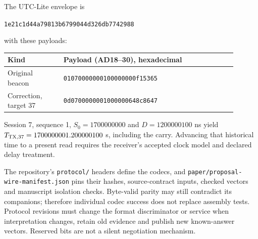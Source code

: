 \documentclass[11pt,letterpaper]{article}
\begin{document}
The UTC-Lite envelope is
\begin{center}\small\texttt{1e21c1d44a79813b6799044d326db7742988}\end{center}
with these payloads:
\begin{center}\small
\begin{tabular}{@{}L{0.22\linewidth}L{0.68\linewidth}@{}}\toprule
Kind & Payload (AD18--30), hexadecimal \\\midrule
Original beacon & \texttt{01070000000100000000f15365} \\
Correction, target 37 & \texttt{0d0700000001000000648c8647} \\\bottomrule
\end{tabular}
\end{center}
Session 7, sequence 1, $S_0=1700000000$ and $D=1200000100$ ns yield $T_{{\rm TX},37}=1700000001.200000100$ s, including the carry. Advancing that historical time to a present read requires the receiver's accepted clock model and declared delay treatment.

The repository's \texttt{protocol/} headers define the codecs, and \texttt{paper/proposal-wire-manifest.json} pins their hashes, source-contract inputs, checked vectors and manuscript isolation checks. Byte-valid parity may still contradict its companions; therefore individual codec success does not replace assembly tests. Protocol revisions must change the format discriminator or service when interpretation changes, retain old evidence and publish new known-answer vectors. Reserved bits are not a silent negotiation mechanism.
\end{document}

